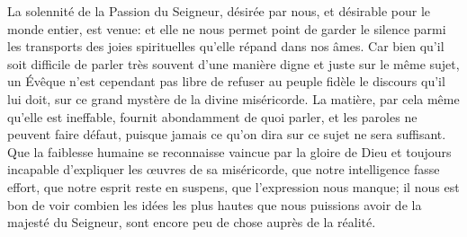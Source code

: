 La solennité de la Passion du Seigneur,
	désirée par nous, et désirable pour le monde entier, est venue:
	et elle ne nous permet point de garder le silence
	parmi les transports des joies spirituelles qu’elle répand dans nos âmes.
Car bien qu’il soit difficile
	de parler très souvent d’une manière digne et juste sur le même sujet,
	un Évêque n’est cependant pas libre
		de refuser au peuple fidèle le discours qu’il lui doit,
	sur ce grand mystère de la divine miséricorde.
La matière, par cela même qu’elle est ineffable,
		fournit abondamment de quoi parler,
	et les paroles ne peuvent faire défaut,
	puisque jamais ce qu’on dira sur ce sujet ne sera suffisant.
Que la faiblesse humaine se reconnaisse vaincue par la gloire de Dieu
	et toujours incapable d’expliquer les œuvres de sa miséricorde,
	que notre intelligence fasse effort, que notre esprit reste en suspens,
	que l’expression nous manque;
	il nous est bon de voir combien les idées les plus hautes
		que nous puissions avoir de la majesté du Seigneur,
	sont encore peu de chose auprès de la réalité.
